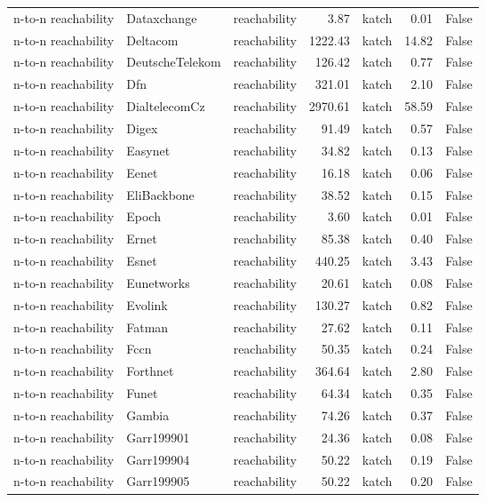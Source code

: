 \begin{tabular}{lllrlrr}
n-to-n reachability & Dataxchange & reachability & 3.87 & katch & 0.01 & False \\
n-to-n reachability & Deltacom & reachability & 1222.43 & katch & 14.82 & False \\
n-to-n reachability & DeutscheTelekom & reachability & 126.42 & katch & 0.77 & False \\
n-to-n reachability & Dfn & reachability & 321.01 & katch & 2.10 & False \\
n-to-n reachability & DialtelecomCz & reachability & 2970.61 & katch & 58.59 & False \\
n-to-n reachability & Digex & reachability & 91.49 & katch & 0.57 & False \\
n-to-n reachability & Easynet & reachability & 34.82 & katch & 0.13 & False \\
n-to-n reachability & Eenet & reachability & 16.18 & katch & 0.06 & False \\
n-to-n reachability & EliBackbone & reachability & 38.52 & katch & 0.15 & False \\
n-to-n reachability & Epoch & reachability & 3.60 & katch & 0.01 & False \\
n-to-n reachability & Ernet & reachability & 85.38 & katch & 0.40 & False \\
n-to-n reachability & Esnet & reachability & 440.25 & katch & 3.43 & False \\
n-to-n reachability & Eunetworks & reachability & 20.61 & katch & 0.08 & False \\
n-to-n reachability & Evolink & reachability & 130.27 & katch & 0.82 & False \\
n-to-n reachability & Fatman & reachability & 27.62 & katch & 0.11 & False \\
n-to-n reachability & Fccn & reachability & 50.35 & katch & 0.24 & False \\
n-to-n reachability & Forthnet & reachability & 364.64 & katch & 2.80 & False \\
n-to-n reachability & Funet & reachability & 64.34 & katch & 0.35 & False \\
n-to-n reachability & Gambia & reachability & 74.26 & katch & 0.37 & False \\
n-to-n reachability & Garr199901 & reachability & 24.36 & katch & 0.08 & False \\
n-to-n reachability & Garr199904 & reachability & 50.22 & katch & 0.19 & False \\
n-to-n reachability & Garr199905 & reachability & 50.22 & katch & 0.20 & False \\

\end{tabular}
